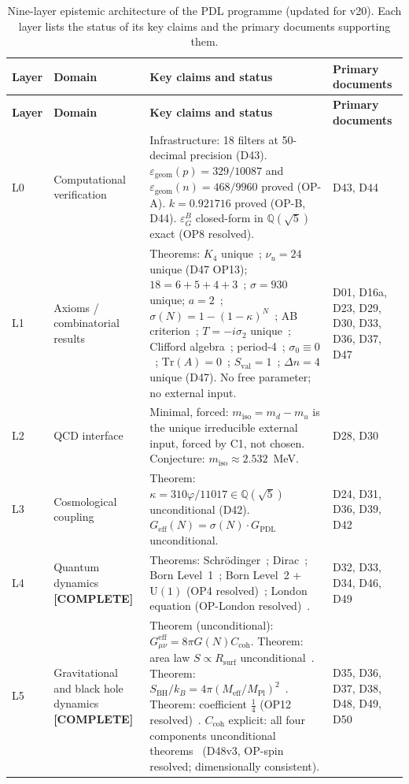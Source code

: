 \documentclass[11pt,a4paper]{article}
\theoremstyle{plain}
\theoremstyle{definition}
\theoremstyle{remark}
\newcommand{\Geff}{G_{\mathrm{eff}}}
\newcommand{\GPDL}{G_{\mathrm{PDL}}}
\newcommand{\Rsurf}{R_{\mathrm{surf}}}
\newcommand{\sigmaN}{\sigma(N)}
\newcommand{\SBH}{S_{\mathrm{BH}}}
\newcommand{\Meff}{M_{\mathrm{eff}}}
\newcommand{\MPl}{M_{\mathrm{Pl}}}
\newcommand{\epsGeomB}{\varepsilon_G^B}
\newcommand{\Ccoh}{C_{\mathrm{coh}}}
\begin{document}
\begin{longtable}{L{0.6cm}L{3.0cm}L{5.5cm}L{4.0cm}}
\caption{Nine-layer epistemic architecture of the PDL programme (updated for v20). Each layer lists the status of its key claims and the primary documents supporting them.}
\label{tab:epistemic}\\
\toprule
\textbf{Layer} & \textbf{Domain} & \textbf{Key claims and status} & \textbf{Primary documents}\\
\midrule
\endfirsthead
\toprule
\textbf{Layer} & \textbf{Domain} & \textbf{Key claims and status} & \textbf{Primary documents}\\
\midrule
\endhead
\bottomrule
\endfoot
L0 & Computational verification & \textcolor{proofblue}{Infrastructure}: 18 filters at 50-decimal precision (D43). $\varepsilon_{\mathrm{geom}}(p)=329/10087$ and $\varepsilon_{\mathrm{geom}}(n)=468/9960$ proved (OP-A). $k=0.921716$ proved (OP-B, D44). $\epsGeomB$ closed-form in $\mathbb{Q}(\sqrt{5})$ exact (OP8 resolved). & D43, D44\\[0.4em]
L1 & Axioms / combinatorial results & \textcolor{proofblue}{Theorems}: $K_4$ unique~\cite{D16a}; $\nu_u=24$ unique (D47 OP13); $18=6+5+4+3$~\cite{D23}; $\sigma=930$ unique; $a=2$~\cite{D30}; $\sigmaN=1-(1-\kappa)^N$~\cite{D24}; AB criterion~\cite{D29}; $T=-i\sigma_2$ unique~\cite{D33}; Clifford algebra~\cite{D33}; period-4~\cite{D33}; $\sigma_0\equiv 0$~\cite{D36}; $\mathrm{Tr}(A)=0$~\cite{D36}; $S_{\mathrm{val}}=1$~\cite{D37}; $\Delta n=4$ unique (D47). No free parameter; no external input. & D01, D16a, D23, D29, D30, D33, D36, D37, D47\\[0.4em]
L2 & QCD interface & Minimal, forced: $m_{\mathrm{iso}}=m_d-m_u$ is the unique irreducible external input, forced by C1, not chosen. \textcolor{conjecturegreen}{Conjecture}: $m_{\mathrm{iso}}\approx 2.532$~MeV. & D28, D30\\[0.4em]
L3 & Cosmological coupling & \textcolor{proofblue}{Theorem}: $\kappa=310\varphi/11017\in\mathbb{Q}(\sqrt{5})$ unconditional (D42). $\Geff(N)=\sigmaN\cdot\GPDL$ unconditional. & D24, D31, D36, D39, D42\\[0.4em]
L4 & Quantum dynamics \textbf{[COMPLETE]} & \textcolor{proofblue}{Theorems}: Schr\"odinger~\cite{D32}; Dirac~\cite{D33}; Born Level~1~\cite{D34}; Born Level~2 + $\mathrm{U}(1)$ (OP4 resolved)~\cite{D46}; London equation (OP-London resolved)~\cite{D49}. & D32, D33, D34, D46, D49\\[0.4em]
L5 & Gravitational and black hole dynamics \textbf{[COMPLETE]} & \textcolor{proofblue}{Theorem} (unconditional): $G_{\mu\nu}^{\mathrm{eff}}=8\pi G(N)\Ccoh$. \textcolor{proofblue}{Theorem}: area law $S\propto\Rsurf$ unconditional~\cite{D37}. \textcolor{proofblue}{Theorem}: $\SBH/k_B=4\pi(\Meff/\MPl)^2$~\cite{D38}. \textcolor{proofblue}{Theorem}: coefficient $\tfrac{1}{4}$ (OP12 resolved)~\cite{D50}. $\Ccoh$ explicit: all four components unconditional theorems~\cite{D48,D51,D52} (D48v3, OP-spin resolved; dimensionally consistent). & D35, D36, D37, D38, D48, D49, D50\\[0.4em]

\end{longtable}
\end{document}
